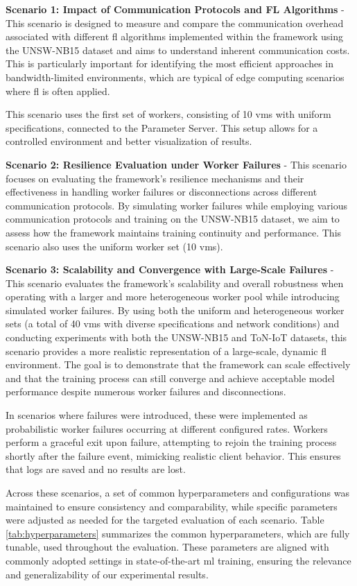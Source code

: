 \textbf{Scenario 1: Impact of Communication Protocols and FL Algorithms} - This scenario is designed to measure and compare the communication overhead associated with different \ac{fl} algorithms implemented within the framework using the UNSW-NB15 dataset and aims to understand inherent communication costs. This is particularly important for identifying the most efficient approaches in bandwidth-limited environments, which are typical of edge computing scenarios where \ac{fl} is often applied. 

This scenario uses the first set of workers, consisting of 10 \acp{vm} with uniform specifications, connected to the Parameter Server. This setup allows for a controlled environment and better visualization of results. 

\textbf{Scenario 2: Resilience Evaluation under Worker Failures} - This scenario focuses on evaluating the framework's resilience mechanisms and their effectiveness in handling worker failures or disconnections across different communication protocols. By simulating worker failures while employing various communication protocols and training on the UNSW-NB15 dataset, we aim to assess how the framework maintains training continuity and performance. This scenario also uses the uniform worker set (10 \acp{vm}).

\textbf{Scenario 3: Scalability and Convergence with Large-Scale Failures} - This scenario evaluates the framework's scalability and overall robustness when operating with a larger and more heterogeneous worker pool while introducing simulated worker failures. By using both the uniform and heterogeneous worker sets (a total of 40 \acp{vm} with diverse specifications and network conditions) and conducting experiments with both the UNSW-NB15 and ToN-IoT datasets, this scenario provides a more realistic representation of a large-scale, dynamic \ac{fl} environment. The goal is to demonstrate that the framework can scale effectively and that the training process can still converge and achieve acceptable model performance despite numerous worker failures and disconnections.


In scenarios where failures were introduced, these were implemented as probabilistic worker failures occurring at different configured rates. Workers perform a graceful exit upon failure, attempting to rejoin the training process shortly after the failure event, mimicking realistic client behavior. This ensures that logs are saved and no results are lost.

Across these scenarios, a set of common hyperparameters and configurations was maintained to ensure consistency and comparability, while specific parameters were adjusted as needed for the targeted evaluation of each scenario. Table \ref{tab:hyperparameters} summarizes the common hyperparameters, which are fully tunable, used throughout the evaluation. These parameters are aligned with commonly adopted settings in state-of-the-art \ac{ml} training, ensuring the relevance and generalizability of our experimental results.

